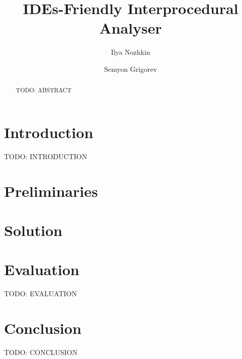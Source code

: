 \documentclass[sigconf]{acmart}
\begin{document}
\title[IDEs-Friendly Interprocedural Analyser]{IDEs-Friendly Interprocedural Analyser}

\author{Ilya Nozhkin}

\author{Semyon Grigorev}

\begin{abstract}
TODO: ABSTRACT
\end{abstract}


\begin{CCSXML}
\end{CCSXML}



\maketitle

\section{Introduction}
TODO: INTRODUCTION

\section{Preliminaries}


\section{Solution}


\section{Evaluation}
TODO: EVALUATION

\section{Conclusion}
TODO: CONCLUSION


 
\end{document}
